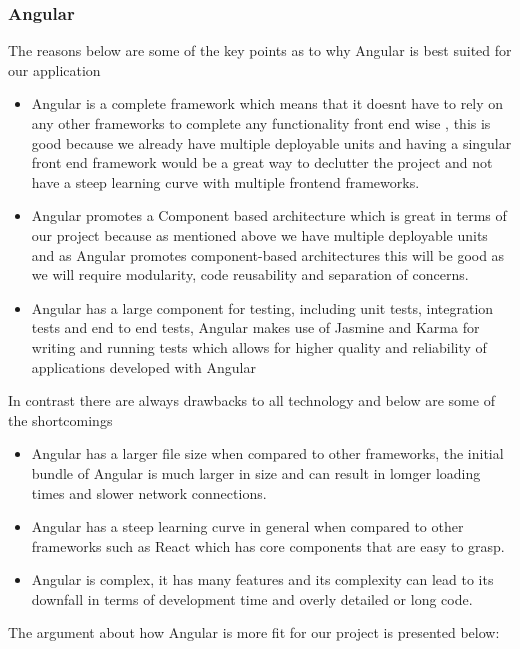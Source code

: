 \documentclass[12pt]{article}
\begin{document}
\subsubsection{Angular}
The reasons below are some of the key points as to why Angular is best suited for our application
\begin{itemize}
    \item Angular is a complete framework which means that it doesnt have to rely on any other frameworks to complete any functionality front end wise , this is good because we already have multiple deployable units and having a singular front end framework would be a great way to declutter the project and not have a steep learning curve with multiple frontend frameworks.
    \item Angular promotes a Component based architecture which is great in terms of our project because as mentioned above we have multiple deployable units and as Angular promotes component-based architectures this will be good as we will require modularity, code reusability and separation of concerns.
    \item Angular has a large component for testing, including unit tests, integration tests and end to end tests, Angular makes use of Jasmine and Karma for writing and running tests which allows for higher quality and reliability of applications developed with Angular
\end{itemize}
In contrast there are always drawbacks to all technology and below are some of the shortcomings
\begin{itemize}
    \item Angular has a larger file size when compared to other frameworks, the initial bundle of Angular is much larger in size and can result in lomger loading times and slower network connections.
    \item Angular has a steep learning curve in general when compared to other frameworks such as React which has core components that are easy to grasp.
    \item Angular is complex, it has many features and its complexity can lead to its downfall in terms of development time and overly detailed or long code.
\end{itemize}
The argument about how Angular is more fit for our project is presented below:
\end{document}
